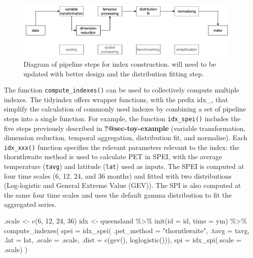 \documentclass[
]{interact}
\newenvironment{Shaded}{\begin{snugshade}}{\end{snugshade}}
\newcommand{\AttributeTok}[1]{\textcolor[rgb]{0.40,0.45,0.13}{#1}}
\newcommand{\DecValTok}[1]{\textcolor[rgb]{0.68,0.00,0.00}{#1}}
\newcommand{\FunctionTok}[1]{\textcolor[rgb]{0.28,0.35,0.67}{#1}}
\newcommand{\NormalTok}[1]{\textcolor[rgb]{0.00,0.23,0.31}{#1}}
\newcommand{\OtherTok}[1]{\textcolor[rgb]{0.00,0.23,0.31}{#1}}
\newcommand{\SpecialCharTok}[1]{\textcolor[rgb]{0.37,0.37,0.37}{#1}}
\newcommand{\StringTok}[1]{\textcolor[rgb]{0.13,0.47,0.30}{#1}}
\begin{document}
\begin{figure}

{\centering \includegraphics[width=1\textwidth,height=0.9\textheight]{figures/pipeline-spei.png}

}

\caption{\label{fig-pipeline-spei}Diagram of pipeline steps for index
construction. will need to be updated with better design and the
distribution fitting step.}

\end{figure}

The function \texttt{compute\_indexes()} can be used to collectively
compute multiple indexes. The tidyindex offers wrapper functions, with
the prefix idx\_, that simplify the calculation of commonly used indexes
by combining a set of pipeline steps into a single function. For
example, the function \texttt{idx\_spei()} includes the five steps
previously described in \textbf{?@sec-toy-example} (variable
transformation, dimension reduction, temporal aggregation, distribution
fit, and normalise). Each \texttt{idx\_xxx()} function specifies the
relevant parameters relevant to the index: the thornthwaite method is
used to calculate PET in SPEI, with the average temperature
(\texttt{tavg}) and latitude (\texttt{lat}) used as inputs. The SPEI is
computed at four time scales (6, 12, 24, and 36 months) and fitted with
two distributions (Log-logistic and General Extreme Value (GEV)). The
SPI is also computed at the same four time scales and uses the default
gamma distribution to fit the aggregated series.

\begin{Shaded}
\begin{Highlighting}[]
\NormalTok{.scale }\OtherTok{\textless{}{-}} \FunctionTok{c}\NormalTok{(}\DecValTok{6}\NormalTok{, }\DecValTok{12}\NormalTok{, }\DecValTok{24}\NormalTok{, }\DecValTok{36}\NormalTok{)}
\NormalTok{idx }\OtherTok{\textless{}{-}}\NormalTok{ queensland }\SpecialCharTok{\%\textgreater{}\%}
  \FunctionTok{init}\NormalTok{(}\AttributeTok{id =}\NormalTok{ id, }\AttributeTok{time =}\NormalTok{ ym) }\SpecialCharTok{\%\textgreater{}\%}
  \FunctionTok{compute\_indexes}\NormalTok{(}
    \AttributeTok{spei =} \FunctionTok{idx\_spei}\NormalTok{(}
      \AttributeTok{.pet\_method =} \StringTok{"thornthwaite"}\NormalTok{, }\AttributeTok{.tavg =}\NormalTok{ tavg, }\AttributeTok{.lat =}\NormalTok{ lat,}
      \AttributeTok{.scale =}\NormalTok{ .scale, }\AttributeTok{.dist =} \FunctionTok{c}\NormalTok{(}\FunctionTok{gev}\NormalTok{(), }\FunctionTok{loglogistic}\NormalTok{())),}
    \AttributeTok{spi =} \FunctionTok{idx\_spi}\NormalTok{(}\AttributeTok{.scale =}\NormalTok{ .scale)}
\NormalTok{  )}
\end{Highlighting}
\end{Shaded}
\end{document}
